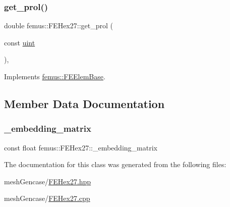 \mbox{\label{classfemus_1_1_f_e_hex27_aa0a6cf0465e5c48c4b5ebf4a4e407124}} 
\subsubsection{\texorpdfstring{get\+\_\+prol()}{get\_prol()}}
{\footnotesize\ttfamily double femus\+::\+F\+E\+Hex27\+::get\+\_\+prol (\begin{DoxyParamCaption}\item[{const \mbox{\hyperlink{_typedefs_8hpp_a91ad9478d81a7aaf2593e8d9c3d06a14}{uint}}}]{ }\end{DoxyParamCaption})\hspace{0.3cm}{\ttfamily [inline]}, {\ttfamily [virtual]}}



Implements \mbox{\hyperlink{classfemus_1_1_f_e_elem_base_ac82326cdc7cb02329c7be9547d56fad4}{femus\+::\+F\+E\+Elem\+Base}}.



\subsection{Member Data Documentation}
\mbox{\label{classfemus_1_1_f_e_hex27_af91845b451a5bb5249886e23ee6786a0}} 
\subsubsection{\texorpdfstring{\+\_\+embedding\+\_\+matrix}{\_embedding\_matrix}}
{\footnotesize\ttfamily const float femus\+::\+F\+E\+Hex27\+::\+\_\+embedding\+\_\+matrix\hspace{0.3cm}{\ttfamily [static]}}



The documentation for this class was generated from the following files\+:\begin{DoxyCompactItemize}
\item 
mesh\+Gencase/\mbox{\hyperlink{_f_e_hex27_8hpp}{F\+E\+Hex27.\+hpp}}\item 
mesh\+Gencase/\mbox{\hyperlink{_f_e_hex27_8cpp}{F\+E\+Hex27.\+cpp}}\end{DoxyCompactItemize}
